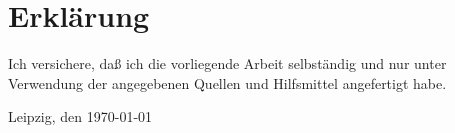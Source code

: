 \documentclass[headsepline,titlepage,twoside,12pt]{report}
\begin{document}



\chapter*{Erklärung}
Ich versichere, daß ich die vorliegende Arbeit selbständig und nur unter
Verwendung der angegebenen Quellen und Hilfsmittel angefertigt habe.

\vspace{9cm}

Leipzig, den \today

\vspace{3cm}

\makeatletter\@author\makeatother
\end{document}
